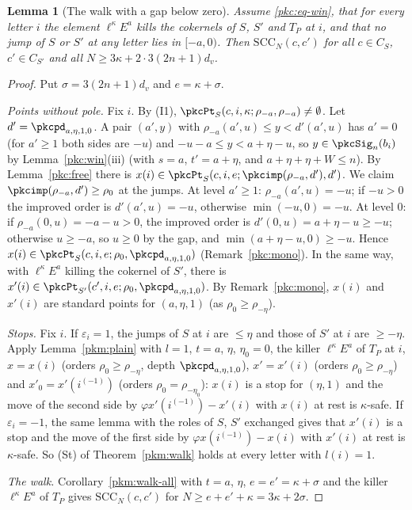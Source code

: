 \documentclass[10pt]{amsart}
\newtheorem{lemma}[theorem]{Lemma}
\theoremstyle{definition}
\theoremstyle{remark}
\begin{document}
\begin{lemma}[The walk with a gap below zero]\label{pkc:gap}
Assume \eqref{pkc:eq-win}, that for every letter $i$ the element $\ell^\kappa E^a$ kills the cokernels of
$S$, $S'$ and $T_P$ at $i$, and that no jump of $S$ or $S'$ at any letter lies in $[-a,0)$. Then
$\mathrm{SCC}_N(c,c')$ for all $c\in C_S$, $c'\in C_{S'}$ and all $N\ge3\kappa+2\cdot3(2n+1)d_v$.
\end{lemma}

\begin{proof}
Put $\sigma=3(2n+1)d_v$ and $e=\kappa+\sigma$.

\emph{Points without pole.} Fix $i$. By (I1), $\pkcPt_S(c,i,\kappa;\rho_{-a},\rho_{-a})\ne\emptyset$.
Let $d'=\pkcpd_{a,\eta,1,0}$. A pair $(a',y)$ with $\rho_{-a}(a',u)\le y<d'(a',u)$ has $a'=0$ (for
$a'\ge1$ both sides are $-u$) and $-u-a\le y<a+\eta-u$, so $y\in\pkcSig_n(b_i)$ by
Lemma~\ref{pkc:win}(iii) (with $s=a$, $t'=a+\eta$, and $a+\eta+\eta+W\le n$). By
Lemma~\ref{pkc:free} there is $x(i)\in\pkcPt_S(c,i,e;\pkcimp(\rho_{-a},d'),d')$. We claim
$\pkcimp(\rho_{-a},d')\ge\rho_0$ at the jumps. At level $a'\ge1$: $\rho_{-a}(a',u)=-u$; if $-u>0$ the
improved order is $d'(a',u)=-u$, otherwise $\min(-u,0)=-u$. At level $0$: if $\rho_{-a}(0,u)=-a-u>0$,
the improved order is $d'(0,u)=a+\eta-u\ge-u$; otherwise $u\ge-a$, so $u\ge0$ by the gap, and
$\min(a+\eta-u,0)\ge-u$. Hence $x(i)\in\pkcPt_S(c,i,e;\rho_0,\pkcpd_{a,\eta,1,0})$ (Remark~\ref{pkc:mono}).
In the same way, with $\ell^\kappa E^a$ killing the cokernel of $S'$, there is
$x'(i)\in\pkcPt_{S'}(c',i,e;\rho_0,\pkcpd_{a,\eta,1,0})$. By Remark~\ref{pkc:mono}, $x(i)$ and $x'(i)$
are standard points for $(a,\eta,1)$ (as $\rho_0\ge\rho_{-\eta}$).

\emph{Stops.} Fix $i$. If $\varepsilon_i=1$, the jumps of $S$ at $i$ are $\le\eta$ and those of $S'$
at $i$ are $\ge-\eta$. Apply Lemma~\ref{pkm:plain} with $l=1$, $t=a$, $\eta$, $\eta_0=0$, the killer
$\ell^\kappa E^a$ of $T_P$ at $i$, $x=x(i)$ (orders $\rho_0\ge\rho_{-\eta}$, depth
$\pkcpd_{a,\eta,1,0}$), $x'=x'(i)$ (orders $\rho_0\ge\rho_{-\eta}$) and $x'_0=x'(i^{(-1)})$ (orders
$\rho_0=\rho_{-\eta_0}$): $x(i)$ is a stop for $(\eta,1)$ and the move of the second side by
$\varphi x'(i^{(-1)})-x'(i)$ with $x(i)$ at rest is $\kappa$-safe. If $\varepsilon_i=-1$, the same
lemma with the roles of $S$, $S'$ exchanged gives that $x'(i)$ is a stop and the move of the first side
by $\varphi x(i^{(-1)})-x(i)$ with $x'(i)$ at rest is $\kappa$-safe. So (St) of
Theorem~\ref{pkm:walk} holds at every letter with $l(i)=1$.

\emph{The walk.} Corollary~\ref{pkm:walk-all} with $t=a$, $\eta$, $e=e'=\kappa+\sigma$ and the killer
$\ell^\kappa E^a$ of $T_P$ gives $\mathrm{SCC}_N(c,c')$ for $N\ge e+e'+\kappa=3\kappa+2\sigma$.
\end{proof}
\end{document}
